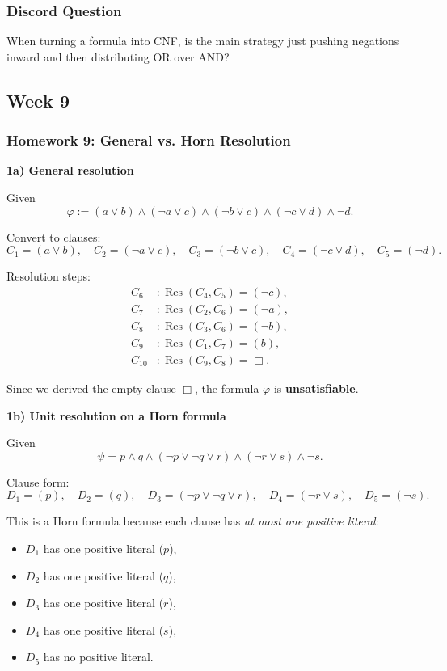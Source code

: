 \documentclass{article}
\theoremstyle{theorem}
\theoremstyle{definition}
\theoremstyle{remark}
\begin{document}
\subsubsection{Discord Question}

When turning a formula into CNF, is the main strategy just pushing negations inward and then distributing OR over AND?

\subsection{Week 9}

\subsubsection{Homework 9: General vs. Horn Resolution}

\textbf{1a) General resolution}

Given
\[
\varphi := (a \lor b) \land (\neg a \lor c) \land (\neg b \lor c) \land (\neg c \lor d) \land \neg d.
\]

Convert to clauses:
\[
C_1=(a \lor b),\quad C_2=(\neg a \lor c),\quad C_3=(\neg b \lor c),\quad C_4=(\neg c \lor d),\quad C_5=(\neg d).
\]

Resolution steps:
\begin{align*}
C_6 &: \operatorname{Res}(C_4,C_5) = (\neg c),\\
C_7 &: \operatorname{Res}(C_2,C_6) = (\neg a),\\
C_8 &: \operatorname{Res}(C_3,C_6) = (\neg b),\\
C_9 &: \operatorname{Res}(C_1,C_7) = (b),\\
C_{10} &: \operatorname{Res}(C_9,C_8) = \Box.
\end{align*}

Since we derived the empty clause $\Box$, the formula $\varphi$ is \textbf{unsatisfiable}.

\vspace{0.3cm}

\textbf{1b) Unit resolution on a Horn formula}

Given
\[
\psi = p \land q \land (\neg p \lor \neg q \lor r) \land (\neg r \lor s) \land \neg s.
\]

Clause form:
\[
D_1=(p),\quad D_2=(q),\quad D_3=(\neg p \lor \neg q \lor r),\quad D_4=(\neg r \lor s),\quad D_5=(\neg s).
\]

This is a Horn formula because each clause has \emph{at most one positive literal}:
\begin{itemize}
  \item $D_1$ has one positive literal ($p$),
  \item $D_2$ has one positive literal ($q$),
  \item $D_3$ has one positive literal ($r$),
  \item $D_4$ has one positive literal ($s$),
  \item $D_5$ has no positive literal.
\end{itemize}
\end{document}
